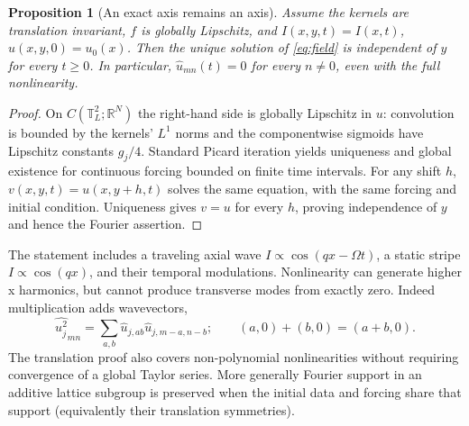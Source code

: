 \documentclass[11pt]{article}
\newtheorem{proposition}{Proposition}
\newcommand{\T}{\mathbb T}
\newcommand{\R}{\mathbb R}
\begin{document}
\begin{proposition}[An exact axis remains an axis]\label{prop:axis}
Assume the kernels are translation invariant, $f$ is globally Lipschitz, and
$I(x,y,t)=I(x,t)$, $u(x,y,0)=u_0(x)$. Then the unique solution of
\eqref{eq:field} is independent of $y$ for every $t\ge0$. In particular,
$\widehat u_{mn}(t)=0$ for every $n\ne0$, even with the full nonlinearity.
\end{proposition}
\begin{proof}
On $C(\T_L^2;\R^N)$ the right-hand side is globally Lipschitz in $u$:
convolution is bounded by the kernels' $L^1$ norms and the componentwise
sigmoids have Lipschitz constants $g_j/4$. Standard Picard iteration yields
uniqueness and global existence for continuous forcing bounded on finite time
intervals. For any shift $h$, $v(x,y,t)=u(x,y+h,t)$ solves the same equation,
with the same forcing and initial condition. Uniqueness gives $v=u$ for every
$h$, proving independence of $y$ and hence the Fourier assertion.
\end{proof}
The statement includes a traveling axial wave $I\propto\cos(qx-\Omega t)$,
a static stripe $I\propto\cos(qx)$, and their temporal modulations.
Nonlinearity can generate higher x harmonics, but cannot produce transverse
modes from exactly zero. Indeed multiplication adds wavevectors,
\begin{equation}
 \widehat{u_j^2}_{mn}=\sum_{a,b}\widehat u_{j,ab}\widehat u_{j,m-a,n-b};
 \qquad (a,0)+(b,0)=(a+b,0).
\end{equation}
The translation proof also covers non-polynomial nonlinearities without
requiring convergence of a global Taylor series. More generally Fourier
support in an additive lattice subgroup is preserved when the initial data
and forcing share that support (equivalently their translation symmetries).

\newpage
\end{document}
